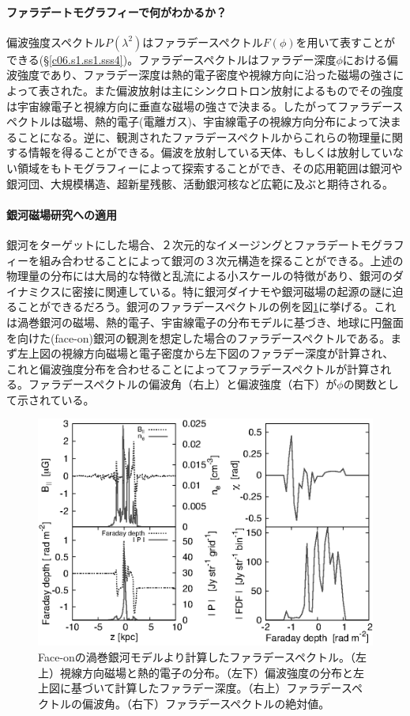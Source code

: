 \paragraph{ファラデートモグラフィーで何がわかるか？}

偏波強度スペクトル$P(\lambda^2)$はファラデースペクトル$F(\phi)$を用いて表すことができる(\S \ref{c06.s1.ss1.sss4})。ファラデースペクトルはファラデー深度$\phi$における偏波強度であり、ファラデー深度は熱的電子密度や視線方向に沿った磁場の強さによって表された。また偏波放射は主にシンクロトロン放射によるものでその強度は宇宙線電子と視線方向に垂直な磁場の強さで決まる。したがってファラデースペクトルは磁場、熱的電子(電離ガス)、宇宙線電子の視線方向分布によって決まることになる。逆に、観測されたファラデースペクトルからこれらの物理量に関する情報を得ることができる。偏波を放射している天体、もしくは放射していない領域をもトモグラフィーによって探索することができ、その応用範囲は銀河や銀河団、大規模構造、超新星残骸、活動銀河核など広範に及ぶと期待される。

\paragraph{銀河磁場研究への適用}

銀河をターゲットにした場合、２次元的なイメージングとファラデートモグラフィーを組み合わせることによって銀河の３次元構造を探ることができる。上述の物理量の分布には大局的な特徴と乱流による小スケールの特徴があり、銀河のダイナミクスに密接に関連している。特に銀河ダイナモや銀河磁場の起源の謎に迫ることができるだろう。銀河のファラデースペクトルの例を図\ref{c06.s1.ss8.f1}に挙げる\citep{2014PASJ...66....5I}。これは渦巻銀河の磁場、熱的電子、宇宙線電子の分布モデルに基づき、地球に円盤面を向けた(face-on)銀河の観測を想定した場合のファラデースペクトルである。まず左上図の視線方向磁場と電子密度から左下図のファラデー深度が計算され、これと偏波強度分布を合わせることによってファラデースペクトルが計算される。ファラデースペクトルの偏波角（右上）と偏波強度（右下）が$\phi$の関数として示されている。

\begin{figure}[tbp]
\begin{center}
\includegraphics[width=0.7\linewidth]{magnetism/c06.s1.ss8.f1.eps}
\end{center}
\caption{Face-onの渦巻銀河モデルより計算したファラデースペクトル\citep{2014PASJ...66....5I}。（左上）視線方向磁場と熱的電子の分布。（左下）偏波強度の分布と左上図に基づいて計算したファラデー深度。（右上）ファラデースペクトルの偏波角。（右下）ファラデースペクトルの絶対値。
}\label{c06.s1.ss8.f1}
\end{figure}

